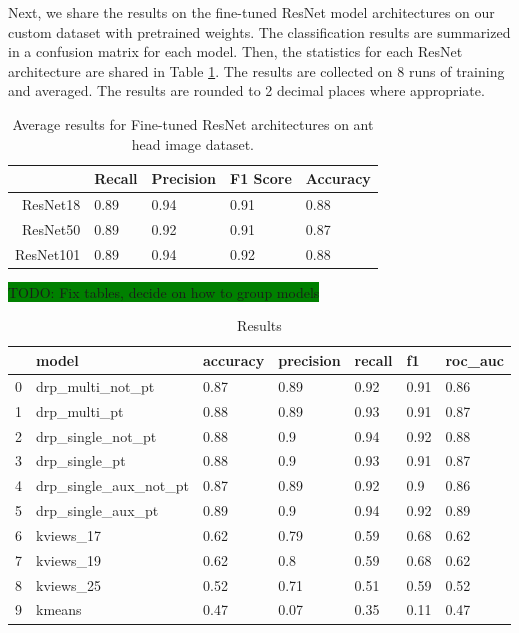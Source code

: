 \documentclass{aci}
\numberwithin{equation}{section}
\begin{document}
Next, we share the results on the fine-tuned ResNet model architectures on our
custom dataset with pretrained weights. The classification results are
summarized in a confusion matrix for each model. Then, the statistics for each
ResNet architecture are shared in Table \ref{tab:fresnet_results}. The results
are collected on 8 runs of training and averaged. The results are rounded
to 2 decimal places where appropriate.

\begin{table}[h]
    \centering
    \caption{Average results for Fine-tuned ResNet architectures on ant head image dataset.}
    \begin{tabular}{r|llll}
                  & Recall & Precision & F1 Score & Accuracy \\
        \hline
        ResNet18  & 0.89   & 0.94      & 0.91     & 0.88     \\
        ResNet50  & 0.89   & 0.92      & 0.91     & 0.87     \\
        ResNet101 & 0.89   & 0.94      & 0.92     & 0.88     \\
    \end{tabular}
    \label{tab:fresnet_results}
\end{table}

\colorbox{green}{TODO: Fix tables, decide on how to group models}

\begin{table}[h]
    \centering
    \caption{Results}
    \begin{tabular}{lllllll}
        \toprule
        {} & model                     & accuracy & precision & recall & f1   & roc\_auc \\
        \midrule
        0  & drp\_multi\_not\_pt       & 0.87     & 0.89      & 0.92   & 0.91 & 0.86     \\
        1  & drp\_multi\_pt            & 0.88     & 0.89      & 0.93   & 0.91 & 0.87     \\
        2  & drp\_single\_not\_pt      & 0.88     & 0.9       & 0.94   & 0.92 & 0.88     \\
        3  & drp\_single\_pt           & 0.88     & 0.9       & 0.93   & 0.91 & 0.87     \\
        4  & drp\_single\_aux\_not\_pt & 0.87     & 0.89      & 0.92   & 0.9  & 0.86     \\
        5  & drp\_single\_aux\_pt      & 0.89     & 0.9       & 0.94   & 0.92 & 0.89     \\
        6  & kviews\_17                & 0.62     & 0.79      & 0.59   & 0.68 & 0.62     \\
        7  & kviews\_19                & 0.62     & 0.8       & 0.59   & 0.68 & 0.62     \\
        8  & kviews\_25                & 0.52     & 0.71      & 0.51   & 0.59 & 0.52     \\
        9  & kmeans                    & 0.47     & 0.07      & 0.35   & 0.11 & 0.47     \\
        \bottomrule
    \end{tabular}
\end{table}
\end{document}
